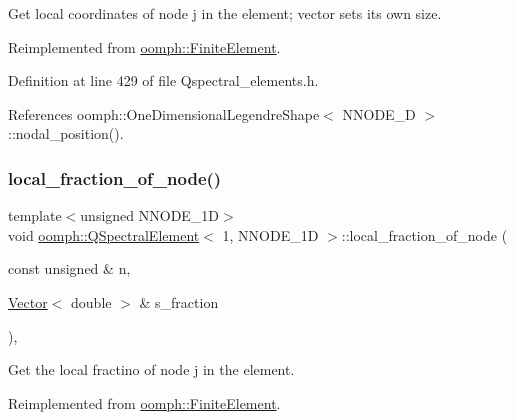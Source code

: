 Get local coordinates of node j in the element; vector sets its own size. 



Reimplemented from \hyperlink{classoomph_1_1FiniteElement_a22bc4ee35e4f948d8d7fba18c7b4f4c4}{oomph\+::\+Finite\+Element}.



Definition at line 429 of file Qspectral\+\_\+elements.\+h.



References oomph\+::\+One\+Dimensional\+Legendre\+Shape$<$ N\+N\+O\+D\+E\+\_\+D $>$\+::nodal\+\_\+position().

\mbox{\label{classoomph_1_1QSpectralElement_3_011_00_01NNODE__1D_01_4_ad79b4f92e47f6dd7ce5793d26e26bb43}} 
\subsubsection{\texorpdfstring{local\+\_\+fraction\+\_\+of\+\_\+node()}{local\_fraction\_of\_node()}}
{\footnotesize\ttfamily template$<$unsigned N\+N\+O\+D\+E\+\_\+1D$>$ \\
void \hyperlink{classoomph_1_1QSpectralElement}{oomph\+::\+Q\+Spectral\+Element}$<$ 1, N\+N\+O\+D\+E\+\_\+1D $>$\+::local\+\_\+fraction\+\_\+of\+\_\+node (\begin{DoxyParamCaption}\item[{const unsigned \&}]{n,  }\item[{\hyperlink{classoomph_1_1Vector}{Vector}$<$ double $>$ \&}]{s\+\_\+fraction }\end{DoxyParamCaption})\hspace{0.3cm}{\ttfamily [inline]}, {\ttfamily [virtual]}}



Get the local fractino of node j in the element. 



Reimplemented from \hyperlink{classoomph_1_1FiniteElement_a41640b9a9e5f6461cd8ebb8218502b07}{oomph\+::\+Finite\+Element}.



